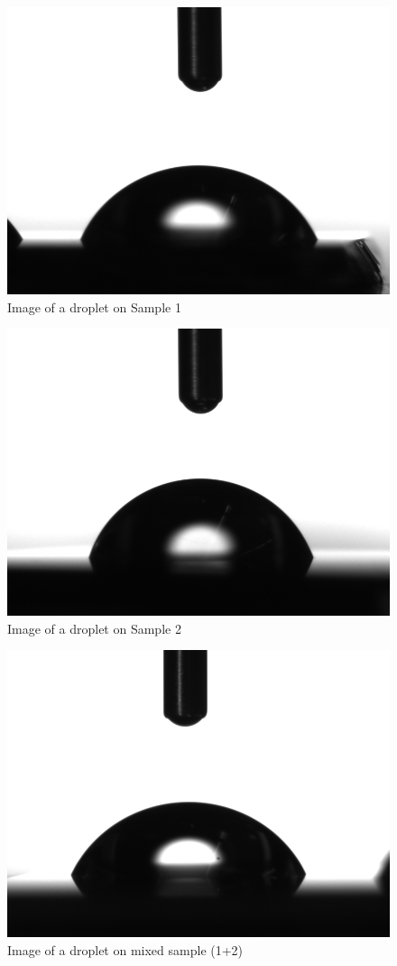 \begin{figure}[h]
\centering
\includegraphics[width=0.7\columnwidth]{sample1.jpg}
\caption{Image of a droplet on Sample 1}
\label{fig:sample1}
\end{figure}

\begin{figure}[h]
\centering
\includegraphics[width=0.7\columnwidth]{sample2.jpg}
\caption{Image of a droplet on Sample 2}
\label{fig:sample2}
\end{figure}

\begin{figure}[h]
\centering
\includegraphics[width=0.7\columnwidth]{sample1plus2.jpg}
\caption{Image of a droplet on mixed sample (1+2)}
\label{fig:sample1plus2}
\end{figure}

